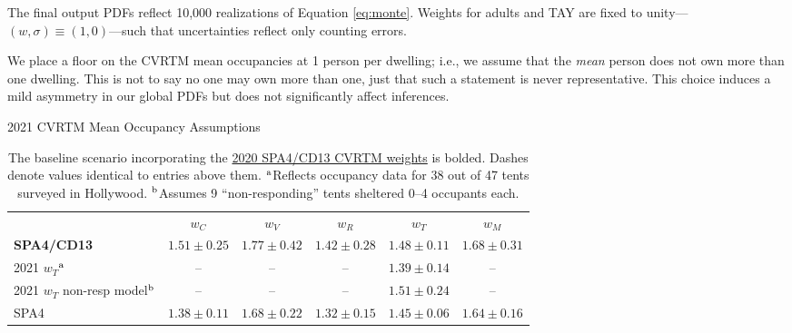 \documentclass[11pt,twocolumn]{article}
\begin{document}
The final output PDFs reflect 10,000 realizations of Equation \ref{eq:monte}. Weights for 
adults and TAY are fixed to unity---$(w,\sigma)\equiv(1,0)$---such that uncertainties reflect only 
counting errors. 


We place a floor on the CVRTM mean occupancies at 1 person per dwelling; i.e., we assume that the 
{\it mean} person does not own more than one dwelling. This is not to say no one may own more than 
one, just that such a statement is never representative. This choice induces a mild asymmetry in our 
global PDFs but does not significantly affect inferences.

\begin{table}[t]
\centering
\caption{2021 CVRTM Mean Occupancy Assumptions}
\begin{tabular}{lccccc}
\toprule
 & $w_{C}$ & $w_{V}$ & $w_{R}$ & $w_{T}$ & $w_{M}$ \\ \cmidrule{1-6}
{\bf SPA4/CD13} & $1.51\pm0.25$ & $1.77\pm0.42$ & $1.42\pm0.28$ & $1.48\pm0.11$ & $1.68\pm0.31$ \\
2021 $w_{T}$$^{\rm a}$ & -- & -- & -- & $1.39\pm0.14$ & --\\
2021 $w_{T}$ non-resp model$^{\rm b}$ & -- & -- & --& $1.51\pm0.24$ & --\\
SPA4 & $1.38\pm0.11$ & $1.68\pm0.22$ & $1.32\pm0.15$ & $1.45\pm0.06$ & $1.64\pm0.16$\\
\bottomrule
\end{tabular}
\caption*{The baseline scenario incorporating the 
\href{https://www.lahsa.org/documents?id=4635-usc-2018-2020-multipliers-and-estimates-overview}
{2020 SPA4/CD13 CVRTM weights} is bolded. Dashes denote values identical to entries above them.
$^{\rm a}$Reflects occupancy data for 38 out of 47 tents surveyed in Hollywood. 
$^{\rm b}$Assumes 9 ``non-responding'' tents sheltered 0--4 occupants each.}
\label{tbl:weights}
\end{table}
\end{document}
